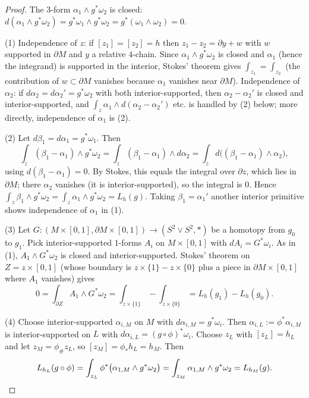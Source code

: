 \begin{proof}
The $3$-form $\alpha_1\wedge g^*\omega_2$ is closed: $d(\alpha_1\wedge g^*\omega_2)=g^*\omega_1\wedge g^*\omega_2=g^*(\omega_1\wedge\omega_2)=0$.

(1) Independence of $z$: if $[z_1]=[z_2]=h$ then $z_1-z_2=\partial y+w$ with $w$ supported in $\partial M$ and $y$ a relative $4$-chain. Since $\alpha_1\wedge g^*\omega_2$ is closed and $\alpha_1$ (hence the integrand) is supported in the interior, Stokes' theorem gives $\int_{z_1}=\int_{z_2}$ (the contribution of $w\subset\partial M$ vanishes because $\alpha_1$ vanishes near $\partial M$). Independence of $\alpha_2$: if $d\alpha_2=d\alpha_2'=g^*\omega_2$ with both interior-supported, then $\alpha_2-\alpha_2'$ is closed and interior-supported, and $\int_z\alpha_1\wedge d(\alpha_2-\alpha_2')$ etc. is handled by (2) below; more directly, independence of $\alpha_1$ is (2).

(2) Let $d\beta_1=d\alpha_1=g^*\omega_1$. Then
\[
\int_z(\beta_1-\alpha_1)\wedge g^*\omega_2=\int_z(\beta_1-\alpha_1)\wedge d\alpha_2=\int_z d\big((\beta_1-\alpha_1)\wedge\alpha_2\big),
\]
using $d(\beta_1-\alpha_1)=0$. By Stokes, this equals the integral over $\partial z$, which lies in $\partial M$; there $\alpha_2$ vanishes (it is interior-supported), so the integral is $0$. Hence $\int_z\beta_1\wedge g^*\omega_2=\int_z\alpha_1\wedge g^*\omega_2=L_h(g)$. Taking $\beta_1=\alpha_1'$ another interior primitive shows independence of $\alpha_1$ in (1).

(3) Let $G:(M\times[0,1],\partial M\times[0,1])\to(S^2\vee S^2,*)$ be a homotopy from $g_0$ to $g_1$. Pick interior-supported $1$-forms $A_i$ on $M\times[0,1]$ with $dA_i=G^*\omega_i$. As in (1), $A_1\wedge G^*\omega_2$ is closed and interior-supported. Stokes' theorem on $Z=z\times[0,1]$ (whose boundary is $z\times\{1\}-z\times\{0\}$ plus a piece in $\partial M\times[0,1]$ where $A_1$ vanishes) gives
\[
0=\int_{\partial Z}A_1\wedge G^*\omega_2=\int_{z\times\{1\}}-\int_{z\times\{0\}}=L_h(g_1)-L_h(g_0).
\]

(4) Choose interior-supported $\alpha_{i,M}$ on $M$ with $d\alpha_{i,M}=g^*\omega_i$. Then $\alpha_{i,L}:=\phi^*\alpha_{i,M}$ is interior-supported on $L$ with $d\alpha_{i,L}=(g\circ\phi)^*\omega_i$. Choose $z_L$ with $[z_L]=h_L$ and let $z_M=\phi_\#z_L$, so $[z_M]=\phi_*h_L=h_M$. Then
\[
L_{h_L}(g\circ\phi)=\int_{z_L}\phi^*\big(\alpha_{1,M}\wedge g^*\omega_2\big)=\int_{z_M}\alpha_{1,M}\wedge g^*\omega_2=L_{h_M}(g).\qedhere
\]
\end{proof}

